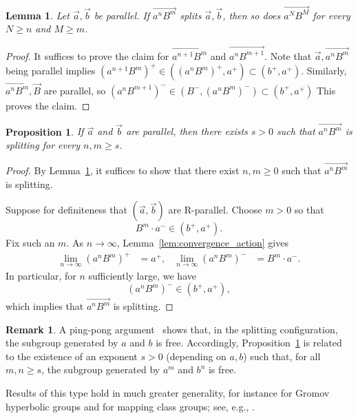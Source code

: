 \documentclass[11pt]{amsart}
\newcommand{\ora}[1]{\overrightarrow{#1}}
\numberwithin{equation}{section}
\numberwithin{figure}{section}
\newtheorem{lemma}[theorem]{Lemma}
\newtheorem{proposition}[theorem]{Proposition}
\theoremstyle{definition}
\newtheorem{remark}[theorem]{Remark}
\theoremstyle{plain}
\begin{document}
\begin{lemma}
Let $\ora{a},\ora{b}$ be parallel. If $\ora{a^nB^m}$ splits $\ora{a},\ora{b}$, then so does
$\ora{a^NB^M}$ for every $N \geq n$ and $M \geq m$.
\label{lem:once_splits}
\end{lemma}
\begin{proof}
It suffices to prove the claim for $\ora{a^{n+1}B^m}$ and $\ora{a^nB^{m+1}}$.
Note that $\ora{a},\ora{a^nB^m}$ being parallel implies
$(a^{n+1}B^m)^+ \in ((a^nB^m)^+, a^+) \subset (b^+, a^+)$.
Similarly, $\ora{a^nB^m},\ora{B}$ are parallel, so $(a^nB^{m+1})^- \in (B^-, (a^nB^m)^-) \subset (b^+,a^+)$
This proves the claim.
\end{proof}

\begin{proposition}
If $\ora{a}$ and $\ora{b}$ are parallel, then there exists $s > 0$ such that
$\ora{a^n B^m}$ is splitting for every $n,m \ge s$.
\label{prop:eventual_splitting}
\end{proposition}

\begin{proof}
By Lemma~\ref{lem:once_splits}, it suffices to show that there exist $n,m \geq 0$
such that $\ora{a^{n} B^{m}}$ is splitting.

Suppose for definiteness that $(\ora{a},\ora{b})$ are R-parallel.
Choose $m>0$ so that
\[
B^m \cdot a^- \in (b^+, a^+).
\]
Fix such an $m$. As $n \to \infty$, Lemma~\ref{lem:convergence_action} gives
\begin{align*}
\lim_{n \to \infty} (a^n B^m)^+ &= a^+, &
\lim_{n \to \infty} (a^n B^m)^- &= B^m \cdot a^-.
\end{align*}
In particular, for $n$ sufficiently large, we have
\[
(a^n B^m)^- \in (b^+, a^+),
\]
which implies that $\ora{a^n B^m}$ is splitting.
\end{proof}

\begin{remark}
A ping-pong argument~\cite[\S 8.2.E]{Gromov1987HyperbolicGroups}
shows that, in the splitting configuration, the subgroup generated by $a$ and $b$
is free.
Accordingly, Proposition~\ref{prop:eventual_splitting} is related to the existence
of an exponent $s>0$ (depending on $a,b$) such that, for all $m,n \ge s$,
the subgroup generated by $a^m$ and $b^n$ is free.

Results of this type hold in much greater generality, for instance for
Gromov hyperbolic groups and for mapping class groups; see, e.g.,
\cite{Fujiwara2015SubgroupsPseudoAnosovII}.
\end{remark}
\end{document}
